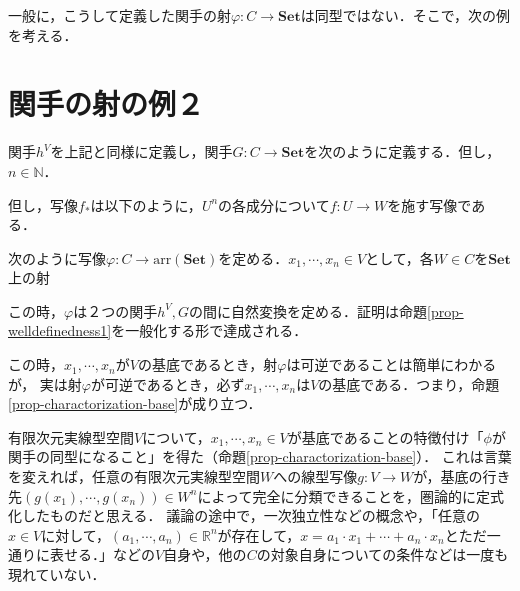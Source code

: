 \documentclass[uplatex, 12pt, dvipdfmx]{jsreport}
\begin{document}
一般に，こうして定義した関手の射$\varphi :C\to\mathbf{Set}$は同型ではない．そこで，次の例を考える．

\section{関手の射の例２}\label{section-vectorspace-2}

関手$h^V$を上記と同様に定義し，関手$G:C\to\mathbf{Set}$を次のように定義する．但し，$n\in\mathbb{N}$．
\begin{center}\end{center}
但し，写像$f_*$は以下のように，$U^n$の各成分について$f:U\to W$を施す写像である．
\begin{center}\end{center}

次のように写像$\varphi :C\to \mathrm{arr}(\mathbf{Set})$を定める．$x_1,\cdots,x_n\in V$として，各$W\in C$を$\mathbf{Set}$上の射
\begin{center}\end{center}
この時，$\varphi$は２つの関手$h^V,G$の間に自然変換を定める．証明は命題\ref{prop-welldefinedness1}を一般化する形で達成される．

この時，$x_1,\cdots,x_n$が$V$の基底であるとき，射$\varphi$は可逆であることは簡単にわかるが，
実は射$\varphi$が可逆であるとき，必ず$x_1,\cdots,x_n$は$V$の基底である．つまり，命題\ref{prop-charactorization-base}が成り立つ．

\begin{screen}
    有限次元実線型空間$V$について，$x_1,\cdots,x_n\in V$が基底であることの特徴付け「$\phi$が関手の同型になること」を得た（命題\ref{prop-charactorization-base}）．
    これは言葉を変えれば，任意の有限次元実線型空間$W$への線型写像$g:V\to W$が，基底の行き先$(g(x_1),\cdots,g(x_n))\in W^n$によって完全に分類できることを，圏論的に定式化したものだと思える．
    議論の途中で，一次独立性などの概念や，「任意の$x\in V$に対して，$(a_1,\cdots,a_n)\in\mathbb{R}^n$が存在して，$x=a_1\cdot x_1 + \cdots + a_n\cdot x_n$とただ一通りに表せる．」などの$V$自身や，他の$C$の対象自身についての条件などは一度も現れていない．
\end{screen}
\end{document}
